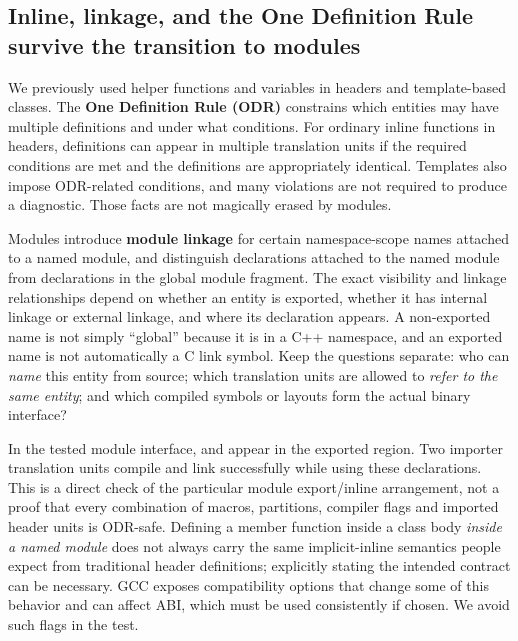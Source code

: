 \subsection{Inline, linkage, and the One Definition Rule survive the transition to modules}\label{05-engine-i-ch006-inline-linkage-and-the-one-definition-rule-survive-the-transition-to-modules}

\hypertarget{05-engine-i-ch006-inline-linkage-and-the-one-definition-rule-survive-the-transition-to-modules}{}

We previously used  helper functions and variables in headers and template-based classes. The \textbf{One Definition Rule (ODR)} constrains which entities may have multiple definitions and under what conditions. For ordinary inline functions in headers, definitions can appear in multiple translation units if the required conditions are met and the definitions are appropriately identical. Templates also impose ODR-related conditions, and many violations are not required to produce a diagnostic. Those facts are not magically erased by modules.

Modules introduce \textbf{module linkage} for certain namespace-scope names attached to a named module, and distinguish declarations attached to the named module from declarations in the global module fragment. The exact visibility and linkage relationships depend on whether an entity is exported, whether it has internal linkage or external linkage, and where its declaration appears. A non-exported name is not simply ``global'' because it is in a C++ namespace, and an exported name is not automatically a C link symbol. Keep the questions separate: who can \emph{name} this entity from source; which translation units are allowed to \emph{refer to the same entity}; and which compiled symbols or layouts form the actual binary interface?

In the tested module interface,  and  appear in the exported region. Two importer translation units compile and link successfully while using these declarations. This is a direct check of the particular module export/inline arrangement, not a proof that every combination of macros, partitions, compiler flags and imported header units is ODR-safe. Defining a member function inside a class body \emph{inside a named module} does not always carry the same implicit-inline semantics people expect from traditional header definitions; explicitly stating the intended  contract can be necessary. GCC exposes compatibility options that change some of this behavior and can affect ABI, which must be used consistently if chosen. We avoid such flags in the test.

